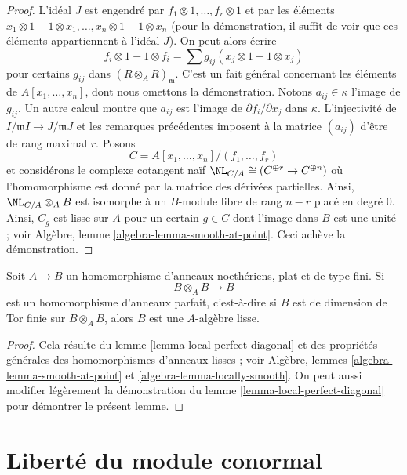 \begin{proof}
\medskip\noindent
L'idéal $J$ est engendré par $f_1 \otimes 1, \ldots, f_r \otimes 1$
et par les éléments $x_1 \otimes 1 - 1 \otimes x_1, \ldots,
x_n \otimes 1 - 1 \otimes x_n$ (pour la démonstration, il
suffit de voir que ces éléments appartiennent à l'idéal $J$).
On peut alors écrire
$$
f_i \otimes 1 - 1 \otimes f_i =
\sum g_{ij} (x_j \otimes 1 - 1 \otimes x_j)
$$
pour certains $g_{ij}$ dans $(R \otimes_A R)_\mathfrak m$. C'est un fait général
concernant les éléments de $A[x_1, \ldots, x_n]$, dont nous omettons la
démonstration. Notons $a_{ij} \in\kappa$ l'image de $g_{ij}$. Un autre calcul
montre que $a_{ij}$ est l'image de $\partial f_i / \partial x_j$ dans $\kappa$.
L'injectivité de $I/\mathfrak m I \to J/\mathfrak m J$ et les remarques
précédentes imposent à la matrice $(a_{ij})$ d'être de rang maximal $r$.
Posons
$$
C = A[x_1, \ldots, x_n]/(f_1, \ldots, f_r)
$$
et considérons le complexe cotangent naïf
$\NL_{C/A} \cong (C^{\oplus r} \to C^{\oplus n})$
où l'homomorphisme est donné par la matrice des dérivées partielles.
Ainsi, $\NL_{C/A} \otimes_A B$
est isomorphe à un $B$-module libre de rang $n - r$ placé en degré $0$.
Ainsi, $C_g$ est lisse sur $A$ pour un certain $g \in C$ dont l'image
dans $B$ est une unité ; voir Algèbre, lemme \ref{algebra-lemma-smooth-at-point}.
Ceci achève la démonstration.
\end{proof}

\begin{lemma}
\label{lemma-perfect-diagonal}
Soit $A \to B$ un homomorphisme d'anneaux noethériens, plat et de type fini. Si
$$
B \otimes_A B \longrightarrow B
$$
est un homomorphisme d'anneaux parfait, c'est-à-dire si $B$ est de dimension de Tor finie sur
$B \otimes_A B$, alors $B$ est une $A$-algèbre lisse.
\end{lemma}

\begin{proof}
Cela résulte du lemme \ref{lemma-local-perfect-diagonal} et des
propriétés générales des homomorphismes d'anneaux lisses ;
voir Algèbre, lemmes \ref{algebra-lemma-smooth-at-point} et
\ref{algebra-lemma-locally-smooth}.
On peut aussi modifier légèrement la démonstration du
lemme \ref{lemma-local-perfect-diagonal} pour démontrer le
présent lemme.
\end{proof}






\section{Liberté du module conormal}
\label{section-freeness-conormal}

